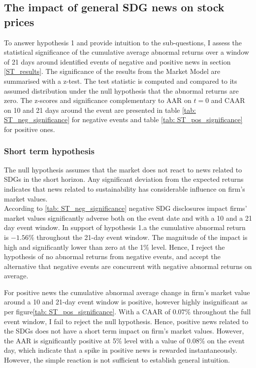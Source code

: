 

\subsection{The impact of general SDG news on stock prices} \label{sec: short_term_analysis}

To answer hypothesis 1 and provide intuition to the sub-questions, I assess the statistical significance of the cumulative average abnormal returns over a window of 21 days around identified events of negative and positive news in section \ref{ST_results}.  
The significance of the results from the Market Model are summarised with a z-test. The test statistic is computed and compared to its assumed distribution under the null hypothesis that the abnormal returns are zero. The z-scores and significance complementary to AAR on $t=0$ and CAAR on 10 and 21 days around the event are presented in table \ref{tab: ST_neg_significance} for negative events and table \ref{tab: ST_pos_significance} for positive ones.  

\subsubsection{Short term hypothesis}

The null hypothesis assumes that the market does not react to news related to SDGs in the short horizon. Any significant deviation from the expected returns indicates that news related to sustainability has considerable influence on firm's market values.  \\
 
According to \ref{tab: ST_neg_significance} negative SDG disclosures impact firms' market values significantly adverse both on the event date and with a 10 and a 21 day event window. In support of hypothesis 1.a the cumulative abnormal return is $-1.56\%$ throughout the 21-day event window. The magnitude of the impact is high and significantly lower than zero at the 1\% level. Hence, I reject the hypothesis of no abnormal returns from negative events, and accept the alternative that negative events are concurrent with negative abnormal returns on average. 

For positive news the cumulative abnormal average change in firm's market value around a 10 and 21-day event window is positive, however highly insignificant as per figure\ref{tab: ST_pos_significance}. With a CAAR of 0.07\% throughout the full event window, I fail to reject the null hypothesis. Hence, positive news related to the SDGs does not have a short term impact on firm's market values. However, the AAR is significantly positive at 5\% level with a value of 0.08\% on the event day, which indicate that a spike in positive news is rewarded instantaneously. However, the simple reaction is not sufficient to establish general intuition.

